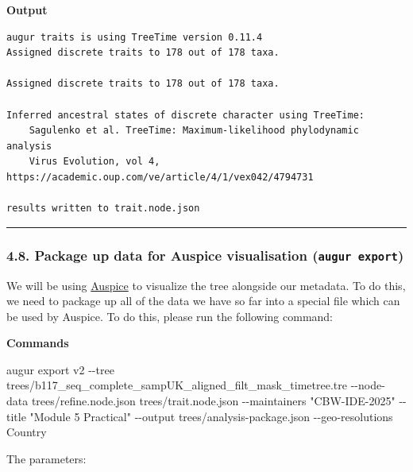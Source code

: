 \documentclass[
]{book}
\newenvironment{Shaded}{\begin{snugshade}}{\end{snugshade}}
\newcommand{\AttributeTok}[1]{\textcolor[rgb]{0.13,0.29,0.53}{#1}}
\newcommand{\ExtensionTok}[1]{#1}
\newcommand{\NormalTok}[1]{#1}
\newcommand{\StringTok}[1]{\textcolor[rgb]{0.31,0.60,0.02}{#1}}
\begin{document}
\textbf{Output}

\begin{verbatim}
augur traits is using TreeTime version 0.11.4
Assigned discrete traits to 178 out of 178 taxa.

Assigned discrete traits to 178 out of 178 taxa.

Inferred ancestral states of discrete character using TreeTime:
    Sagulenko et al. TreeTime: Maximum-likelihood phylodynamic analysis
    Virus Evolution, vol 4, https://academic.oup.com/ve/article/4/1/vex042/4794731

results written to trait.node.json
\end{verbatim}

\begin{center}\rule{0.5\linewidth}{0.5pt}\end{center}

\subsubsection{\texorpdfstring{4.8. Package up data for Auspice visualisation (\texttt{augur\ export})}{4.8. Package up data for Auspice visualisation (augur export)}}\label{package-up-data-for-auspice-visualisation-augur-export}

We will be using \href{https://auspice.us/}{Auspice} to visualize the tree alongside our metadata. To do this, we need to package up all of the data we have so far into a special file which can be used by Auspice. To do this, please run the following command:

\textbf{Commands}

\begin{Shaded}
\begin{Highlighting}[]
\ExtensionTok{augur}\NormalTok{ export v2 }\AttributeTok{{-}{-}tree}\NormalTok{ trees/b117\_seq\_complete\_sampUK\_aligned\_filt\_mask\_timetree.tre }\AttributeTok{{-}{-}node{-}data}\NormalTok{ trees/refine.node.json trees/trait.node.json }\AttributeTok{{-}{-}maintainers} \StringTok{"CBW{-}IDE{-}2025"} \AttributeTok{{-}{-}title} \StringTok{"Module 5 Practical"} \AttributeTok{{-}{-}output}\NormalTok{ trees/analysis{-}package.json }\AttributeTok{{-}{-}geo{-}resolutions}\NormalTok{ Country}
\end{Highlighting}
\end{Shaded}

The parameters:
\end{document}
